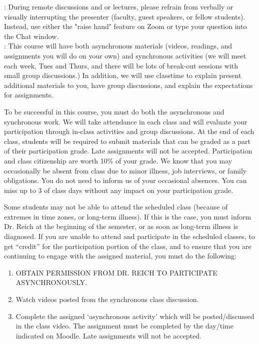 \documentclass[10pt]{article}
\begin{document}
: During remote discussions and or lectures, please refrain from verbally or visually interrupting the presenter (faculty, guest speakers, or fellow students). Instead, use either the "raise hand" feature on Zoom or type your question into the Chat window. \\

: This course will have both asynchronous materials (videos, readings, and assignments you will do on your own) and synchronous activities (we will meet each week, Tues and Thurs, and there will be lots of break-out sessions with small group discussions.) In addition, we will use classtime to explain present additional materials to you, have group discussions, and explain the expectations for assignments. 
 
To be successful in this course, you must do both the asynchronous and synchronous work. 
We will take attendance in each class and will evaluate your participation through in-class activities and group discussions. At the end of each class, students will be required to submit materials that can be graded as a part of their participation grade. Late assignments will not be accepted. Participation and class citizenship are worth 10\% of your grade. We know that you may occasionally be absent from class due to minor illness, job interviews, or family obligations. You do not need to inform us of your occasional absences. You can miss up to 3 of class days without any impact on your participation grade.   
 
Some students may not be able to attend the scheduled class (because of extremes in time zones, or long-term illness). If this is the case, you must inform Dr. Reich at the beginning of the semester, or as soon as long-term illness is diagnosed. If you are unable to attend and participate in the scheduled classes, to get ``credit'' for the participation portion of the class, and to ensure that you are continuing to engage with the assigned material, you must do the following: 
 
\begin{enumerate}
  \item  OBTAIN PERMISSION FROM DR. REICH TO PARTICIPATE ASYNCHRONOUSLY.
  \item Watch videos posted from the synchronous class discussion. 
  \item Complete the assigned `asynchronous activity' which will be posted/discussed in the class video. The assignment must be completed by the day/time indicated on Moodle. Late assignments will not be accepted.
\end{enumerate}
\end{document}
